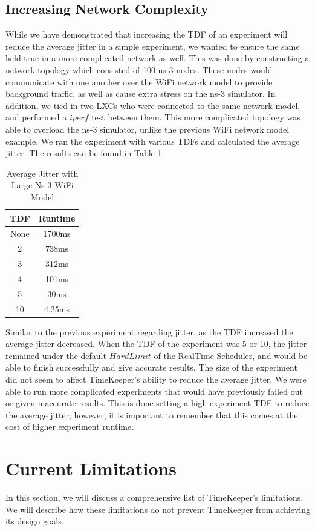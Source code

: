 \subsection{Increasing Network Complexity}
While we have demonstrated that increasing the TDF of an experiment will reduce the average jitter in a simple experiment, we wanted to ensure the same held true in a more complicated network as well. This was done by constructing a network topology which consisted of 100 ns-3 nodes. These nodes would communicate with one another over the WiFi network model to provide background traffic, as well as cause extra stress on the ns-3 simulator. In addition, we tied in two LXCs who were connected to the same network model, and performed a $iperf$ test between them. This more complicated topology was able to overload the ns-3 simulator, unlike the previous WiFi network model example. We ran the experiment with various TDFs and calculated the average jitter. The results can be found in Table \ref{table:complexns3}.
\begin{table}\footnotesize\centering 
\begin{tabular}{|c|c|} 
        \hline 
        TDF & Runtime\\ \hline 
        None & 1700ms \\ \hline 
        2 & 738ms \\ \hline 
        3 & 312ms \\ \hline 
        4 &  101ms \\ \hline 
        5 & 30ms \\ \hline 
        10 & 4.25ms \\ \hline 
        \hline 
        \end{tabular} 
        \caption{Average Jitter with Large Ns-3 WiFi Model} 
        \label{table:complexns3} 
\end{table}
Similar to the previous experiment regarding jitter, as the TDF increased the average jitter decreased. When the TDF of the experiment was 5 or 10, the jitter remained under the default $Hard Limit$ of the RealTime Scheduler, and would be able to finish successfully and give accurate results. The size of the experiment did not seem to affect TimeKeeper's ability to reduce the average jitter. We were able to run more complicated experiments that would have previously failed out or given inaccurate results. This is done setting a high experiment TDF to reduce the average jitter; however, it is important to remember that this comes at the cost of higher experiment runtime.
\section{Current Limitations}
\label{sec:limitations}
In this section, we will discuss a comprehensive list of TimeKeeper's limitations. We will describe how these limitations do not prevent TimeKeeper from achieving its design goals. 
